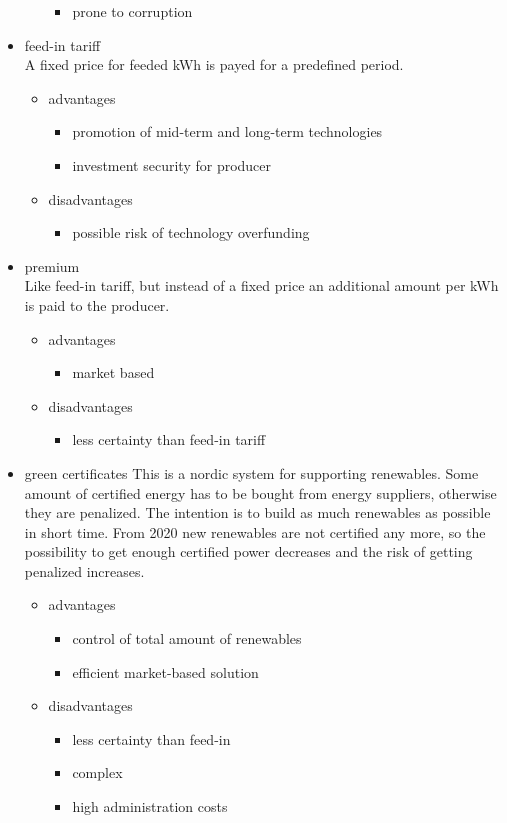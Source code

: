 \documentclass{article}
\begin{document}
\begin{itemize}
\begin{itemize}
\begin{itemize}
\item prone to corruption
\end{itemize}
\end{itemize}
\item feed-in tariff\\
A fixed price for feeded kWh is payed for a predefined period.
\begin{itemize}
\item advantages
\begin{itemize}
\item promotion of mid-term and long-term technologies
\item investment security for producer
\end{itemize}
\item disadvantages
\begin{itemize}
\item possible risk of technology overfunding
\end{itemize}
\end{itemize}
\item premium\\
Like feed-in tariff, but instead of a fixed price an additional amount per kWh is paid to the producer.
\begin{itemize}
\item advantages
\begin{itemize}
\item market based
\end{itemize}
\item disadvantages
\begin{itemize}
\item less certainty than feed-in tariff
\end{itemize}
\end{itemize}
\item green certificates
This is a nordic system for supporting renewables. Some amount of certified energy has to be bought from energy suppliers, otherwise they are penalized. The intention is to build as much renewables as possible in short time. From 2020 new renewables are not certified any more, so the possibility to get enough certified power decreases and the risk of getting penalized increases.
\begin{itemize}
\item advantages
\begin{itemize}
\item control of total amount of renewables
\item efficient market-based solution
\end{itemize}
\item disadvantages
\begin{itemize}
\item less certainty than feed-in
\item complex
\item high administration costs
\end{itemize}
\end{itemize}
\end{itemize}
\end{document}
